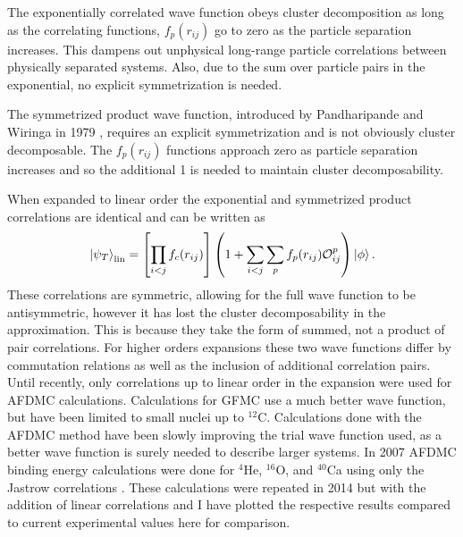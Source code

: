 The exponentially correlated wave function obeys cluster decomposition as long as the correlating functions, $f_p(r_{ij})$ go to zero as the particle separation increases. This dampens out unphysical long-range particle correlations between physically separated systems. Also, due to the sum over particle pairs in the exponential, no explicit symmetrization is needed.

The symmetrized product wave function, introduced by Pandharipande and Wiringa in 1979 \cite{pandharipande1979}, requires an explicit symmetrization and is not obviously cluster decomposable. The $f_p(r_{ij})$ functions approach zero as particle separation increases and so the additional 1 is needed to maintain cluster decomposability.

When expanded to linear order the exponential and symmetrized product correlations are identical and can be written as
\begin{equation}
   \left| \psi_T \right>_\text{lin} = \left[\prod\limits_{i<j}f_c(r_{ij})\right] \left(1+\sum\limits_{i<j}\sum\limits_pf_p(r_{ij})\mathcal{O}_{ij}^p\right) \left| \phi \right>.
\end{equation}
These correlations are symmetric, allowing for the full wave function to be antisymmetric, however it has lost the cluster decomposability in the approximation. This is because they take the form of summed, not a product of pair correlations. For higher orders expansions these two wave functions differ by commutation relations as well as the inclusion of additional correlation pairs. Until recently, only correlations up to linear order in the expansion were used for AFDMC calculations. Calculations for GFMC use a much better wave function, but have been limited to small nuclei up to $^{12}$C. Calculations done with the AFDMC method have been slowly improving the trial wave function used, as a better wave function is surely needed to describe larger systems. In 2007 AFDMC binding energy calculations were done for $^4$He, $^{16}$O, and $^{40}$Ca using only the Jastrow correlations \cite{gandolfi2007}. These calculations were repeated in 2014 but with the addition of linear correlations \cite{gandolfi2014} and I have plotted the respective results compared to current experimental values here for comparison.
